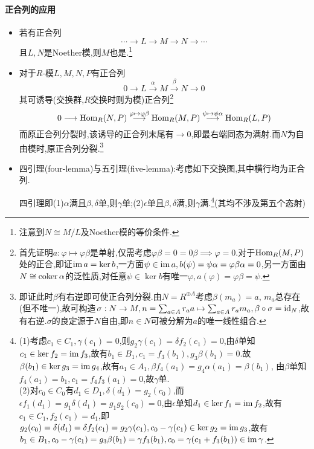 \documentclass[11pt]{article} %
\begin{document}
\paragraph{正合列的应用}
\begin{itemize}
    \item 若有正合列
    $$\cdots\longrightarrow L\longrightarrow M\longrightarrow N\longrightarrow\cdots$$
    且$L,N$是Noether模,则$M$也是.\footnote{注意到$N\cong M/L$及Noether模的等价条件.}
    \item 对于$R$-模$L,M,N,P$有正合列
    $$0\longrightarrow L\overset{\alpha}{\longrightarrow} M\overset{\beta}{\longrightarrow} N\longrightarrow 0$$
    其可诱导(交换群,$R$交换时则为模)正合列\footnote{首先证明$a:\varphi\mapsto \varphi\beta$是单射,仅需考虑$\varphi\beta=0=0\beta\implies \varphi=0$.对于$\operatorname{Hom}_R(M,P)$处的正合,即证$\operatorname{im} a=\ker b$,一方面$\psi\in\operatorname{im} a, b(\psi)=\psi\alpha=\varphi\beta\alpha=0$,另一方面由$N\cong\operatorname{coker}\alpha$的泛性质,对任意$\psi\in\ker b$有唯一$\varphi, a(\varphi)=\varphi\beta=\psi$.}
    $$0\longrightarrow\operatorname{Hom}_R(N,P)\overset{\varphi\mapsto\varphi\beta}{\longrightarrow}\operatorname{Hom}_R(M,P)\overset{\psi\mapsto\psi\alpha}{\longrightarrow}\operatorname{Hom}_R(L,P)$$
    而原正合列分裂时,该诱导的正合列末尾有$\longrightarrow 0$,即最右端同态为满射.而$N$为自由模时,原正合列分裂.\footnote{即证此时$\beta$有右逆即可使正合列分裂.由$N=R^{\oplus A}$考虑$\beta(m_a)=a$, $m_a$总存在(但不唯一),故可构造$\sigma:N\to M, n=\sum_{a\in A}r_a a\mapsto \sum_{a\in A}r_a m_a, \beta\circ\sigma=\mathrm{id}_N$,故有右逆.$\sigma$的良定源于$N$自由,即$n\in N$可被分解为$a$的唯一线性组合.}
    \item 四引理(four-lemma)与五引理(five-lemma):考虑如下交换图,其中横行均为正合列.
    \begin{center}
    \end{center}
    四引理即(1)$\alpha$满且$\beta,\delta$单,则$\gamma$单;(2)$\epsilon$单且$\beta,\delta$满,则$\gamma$满.\footnote{(1)考虑$c_1\in C_1, \gamma(c_1)=0$,则$g_2\gamma(c_1)=\delta f_2(c_1)=0$,由$\delta$单知$c_1\in \ker f_2=\operatorname{im} f_3$,故有$b_1\in B_1, c_1=f_3(b_1), g_3\beta(b_1)=0$.故$\beta(b_1)\in \ker g_3=\operatorname{im} g_4$,故有$a_1\in A_1, \beta f_4(a_1)=g_4\alpha(a_1)=\beta(b_1)$, 由$\beta$单知$f_4(a_1)=b_1, c_1=f_4f_3(a_1)=0$,故$\gamma$单.\\ (2)对$c_0\in C_0$有$d_1\in D_1, \delta(d_1)=g_2(c_0)$,而$\epsilon f_1(d_1)=g_1\delta(d_1)=g_1g_2(c_0)=0$,由$\epsilon$单知$d_1\in \ker f_1=\operatorname{im} f_2$,故有$c_1\in C_1, f_2(c_1)=d_1$,即$g_2(c_0)=\delta(d_1)=\delta f_2(c_1)=g_2\gamma(c_1), c_0-\gamma(c_1)\in \ker g_2=\operatorname{im} g_3$,故有$b_1\in B_1, c_0-\gamma(c_1)=g_3\beta(b_1)=\gamma f_3(b_1), c_0=\gamma(c_1+f_3(b_1))\in \operatorname{im} \gamma$.}(其均不涉及第五个态射)\\

\end{itemize}
\end{document}
